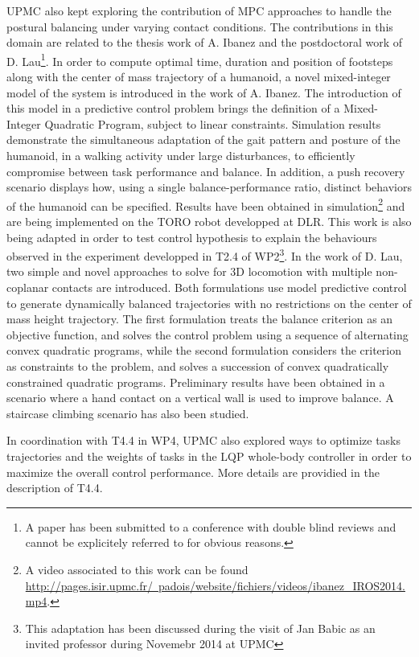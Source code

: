 UPMC also kept exploring the contribution of MPC approaches to  handle the postural balancing under varying contact conditions. The contributions in this domain are related to the thesis work of A. Ibanez \cite{ibanezIROS2014} and the postdoctoral work of D. Lau\footnote{A paper has been submitted to a conference with double blind reviews and cannot be explicitely referred to for obvious reasons.}.  In order to compute optimal time, duration and position of footsteps along with the center of mass trajectory of a humanoid, a novel mixed-integer model of the system is introduced in the work of A. Ibanez. The introduction of this model in a predictive control problem brings the definition of a Mixed-Integer Quadratic Program, subject to linear constraints. Simulation results demonstrate the simultaneous adaptation of the gait pattern and posture of the humanoid, in a walking activity under large disturbances, to efficiently compromise between task performance and balance. In addition, a push recovery scenario displays how, using a single balance-performance ratio, distinct behaviors of the humanoid can be specified. Results have been obtained in simulation\footnote{A video associated to this work can be found \href{here}{http://pages.isir.upmc.fr/~padois/website/fichiers/videos/ibanez\_IROS2014.mp4}.} and are being implemented on the TORO robot developped at DLR. This work is also being adapted in order to test control hypothesis to explain  the behaviours observed in the experiment developped in T2.4 of WP2\footnote{This adaptation has been discussed during the visit of Jan Babic as an invited professor during Novemebr 2014 at  UPMC}. In the work of D. Lau, two simple and novel approaches to solve for 3D locomotion with multiple non-coplanar contacts are introduced. Both formulations use model predictive control to generate dynamically balanced trajectories with no restrictions on the center of mass height trajectory. The first formulation treats the balance criterion as an objective function, and solves the control problem using a sequence of alternating convex quadratic programs, while the second formulation considers the criterion as constraints to the problem, and solves a succession of convex quadratically constrained quadratic programs. Preliminary results have been obtained in a scenario where a hand contact on a vertical wall is used to improve balance. A staircase climbing scenario has also been studied.

In coordination with T4.4 in WP4, UPMC also explored ways to optimize tasks trajectories \cite{lober-HUMANOIDS2014} and the weights of tasks \cite{lobersubmittedIROS2015} in the LQP whole-body controller in order to maximize the overall control performance. More details are providied in the description of T4.4.\\

